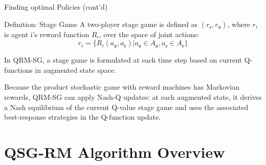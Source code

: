 \documentclass[10pt, aspectratio=169]{beamer}
\newcommand{\evidenzia}[1]{\textcolor{verdeSalvia}{\textbf{#1}}}
\begin{document}
\begin{frame}{Finding optimal Policies (cont'd)}
    

    \begin{block}{Definition: Stage Game}
        A two-player stage game is defined as $(r_\mathfrak{e}, r_\mathfrak{a})$, where $r_i$ is agent i's reward function $R_i$, over the space of joint actions:
        \[r_i = \{R_i(a_\mathfrak{a}, a_\mathfrak{e}) | a_\mathfrak{a}\in{A_\mathfrak{a}}, a_\mathfrak{e}\in{A_\mathfrak{e}}\} \]
    \end{block}
    

    In QRM-SG, a stage game is formulated at each time step based on current Q-functions in augmented state space. 
    
    Because the product stochastic game with reward machines has Markovian rewards, QRM-SG can apply Nash-Q updates: at each augmented state, it derives a Nash equilibrium of the current Q-value stage game and uses the associated best-response strategies in the Q-function update.
\end{frame}

\section{QSG-RM Algorithm Overview}
\end{document}
